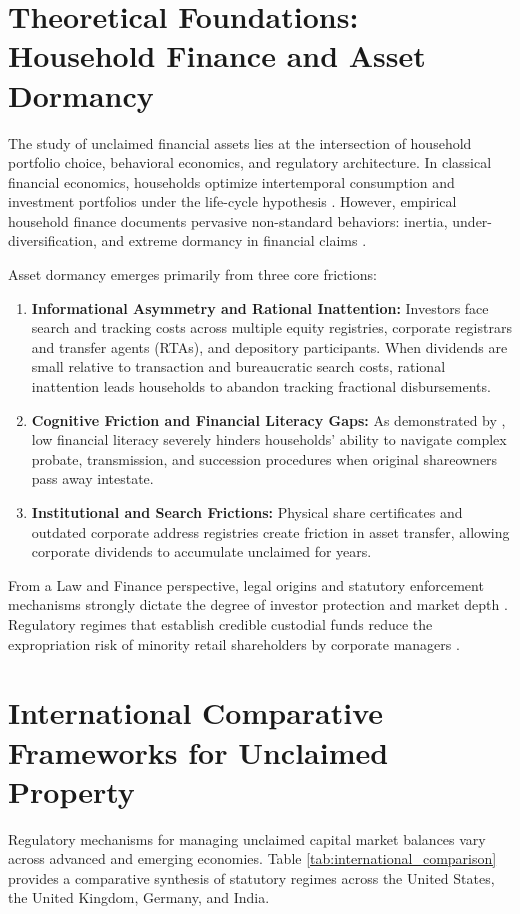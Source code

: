 \documentclass[openany]{book}
\begin{document}
\section{Theoretical Foundations: Household Finance and Asset Dormancy}
The study of unclaimed financial assets lies at the intersection of household portfolio choice, behavioral economics, and regulatory architecture. In classical financial economics, households optimize intertemporal consumption and investment portfolios under the life-cycle hypothesis \cite{campbell2006household}. However, empirical household finance documents pervasive non-standard behaviors: inertia, under-diversification, and extreme dormancy in financial claims \cite{beshears2018behavioral}.

Asset dormancy emerges primarily from three core frictions:
\begin{enumerate}
    \item \textbf{Informational Asymmetry and Rational Inattention:} Investors face search and tracking costs across multiple equity registries, corporate registrars and transfer agents (RTAs), and depository participants. When dividends are small relative to transaction and bureaucratic search costs, rational inattention leads households to abandon tracking fractional disbursements.
    \item \textbf{Cognitive Friction and Financial Literacy Gaps:} As demonstrated by \cite{lusardi2014financial}, low financial literacy severely hinders households' ability to navigate complex probate, transmission, and succession procedures when original shareowners pass away intestate.
    \item \textbf{Institutional and Search Frictions:} Physical share certificates and outdated corporate address registries create friction in asset transfer, allowing corporate dividends to accumulate unclaimed for years.
\end{enumerate}

From a Law and Finance perspective, legal origins and statutory enforcement mechanisms strongly dictate the degree of investor protection and market depth \cite{la1998law}. Regulatory regimes that establish credible custodial funds reduce the expropriation risk of minority retail shareholders by corporate managers \cite{zingales2009future, guiso2008trusting}.

\section{International Comparative Frameworks for Unclaimed Property}
Regulatory mechanisms for managing unclaimed capital market balances vary across advanced and emerging economies. Table \ref{tab:international_comparison} provides a comparative synthesis of statutory regimes across the United States, the United Kingdom, Germany, and India.
\end{document}
